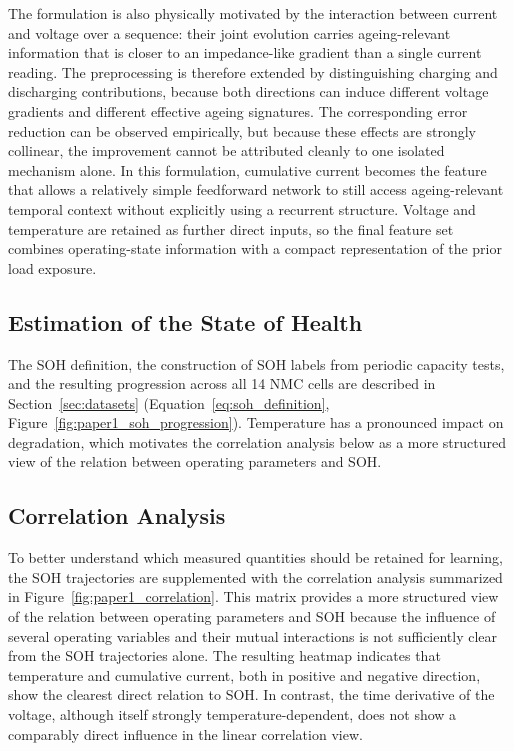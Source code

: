 \documentclass[
    a4paper,
    12pt,
    titlepage,
    bibliography=totoc,
    twoside=on,
    parskip=false,
    numbers=noenddot,
    cleardoublepage=empty,
    DIV=12,
    BCOR=12.0mm,
    headheight=36pt,
    headings=openright
]{scrreprt}
\begin{document}
The formulation is also physically motivated by the interaction between current and voltage over a sequence: their joint evolution carries ageing-relevant information that is closer to an impedance-like gradient than a single current reading. The preprocessing is therefore extended by distinguishing charging and discharging contributions, because both directions can induce different voltage gradients and different effective ageing signatures. The corresponding error reduction can be observed empirically, but because these effects are strongly collinear, the improvement cannot be attributed cleanly to one isolated mechanism alone. In this formulation, cumulative current becomes the feature that allows a relatively simple feedforward network to still access ageing-relevant temporal context without explicitly using a recurrent structure. Voltage and temperature are retained as further direct inputs, so the final feature set combines operating-state information with a compact representation of the prior load exposure.

\subsection{Estimation of the State of Health}
The SOH definition, the construction of SOH labels from periodic capacity tests, and the resulting progression across all 14 NMC cells are described in Section~\ref{sec:datasets} (Equation~\ref{eq:soh_definition}, Figure~\ref{fig:paper1_soh_progression}). Temperature has a pronounced impact on degradation, which motivates the correlation analysis below as a more structured view of the relation between operating parameters and SOH.

\subsection{Correlation Analysis}
To better understand which measured quantities should be retained for learning, the SOH trajectories are supplemented with the correlation analysis summarized in Figure~\ref{fig:paper1_correlation}. This matrix provides a more structured view of the relation between operating parameters and SOH because the influence of several operating variables and their mutual interactions is not sufficiently clear from the SOH trajectories alone. The resulting heatmap indicates that temperature and cumulative current, both in positive and negative direction, show the clearest direct relation to SOH. In contrast, the time derivative of the voltage, although itself strongly temperature-dependent, does not show a comparably direct influence in the linear correlation view.
\end{document}

